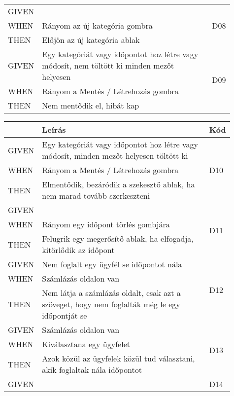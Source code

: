 \begin{table}[H]
\begin{tabular}{|m{0.1\linewidth}|m{0.75\linewidth}|m{0.06\linewidth}|}
		\hline
		GIVEN &  & \multirow{3}{*}{D08} \\ \cline{1-2}
		WHEN  & Rányom az új kategória gombra & \\ \cline{1-2}
		THEN  & Előjön az új kategória ablak & \\ 
		\hline
		GIVEN & Egy kategóriát vagy időpontot hoz létre vagy módosít, nem töltött ki minden mezőt helyesen & \multirow{3}{*}{D09} \\ \cline{1-2}
		WHEN  & Rányom a Mentés / Létrehozás gombra & \\ \cline{1-2}
		THEN  & Nem mentődik el, hibát kap & \\ 
		\hline
	\end{tabular}
\end{table}

\begin{table}[H]
	\centering
	\begin{tabular}{|m{0.1\linewidth}|m{0.75\linewidth}|m{0.06\linewidth}|}
		\hline
		& \textbf{Leírás} & \textbf{Kód} \\
		\hline
		GIVEN & Egy kategóriát vagy időpontot hoz létre vagy módosít, minden mezőt helyesen töltött ki & \multirow{3}{*}{D10} \\ \cline{1-2}
		WHEN  & Rányom a Mentés / Létrehozás gombra & \\ \cline{1-2}
		THEN  & Elmentődik, bezáródik a szekesztő ablak, ha nem marad tovább szerkeszteni & \\ 
		\hline
		GIVEN &  & \multirow{3}{*}{D11} \\ \cline{1-2}
		WHEN  & Rányom egy időpont törlés gombjára & \\ \cline{1-2}
		THEN  & Felugrik egy megerősítő ablak, ha elfogadja, kitörlődik az időpont & \\ 
		\hline
		GIVEN & Nem foglalt egy ügyfél se időpontot nála & \multirow{3}{*}{D12} \\ \cline{1-2}
		WHEN  & Számlázás oldalon van & \\ \cline{1-2}
		THEN  & Nem látja a számlázás oldalt, csak azt a szöveget, hogy nem foglalták még le egy időpontját se & \\ 
		\hline
		GIVEN & Számlázás oldalon van & \multirow{3}{*}{D13} \\ \cline{1-2}
		WHEN  & Kiválasztana egy ügyfelet & \\ \cline{1-2}
		THEN  & Azok közül az ügyfelek közül tud választani, akik foglaltak nála időpontot & \\ 
		\hline
		GIVEN & & \multirow{3}{*}{D14} \\ \cline{1-2}

\end{tabular}
\end{table}
